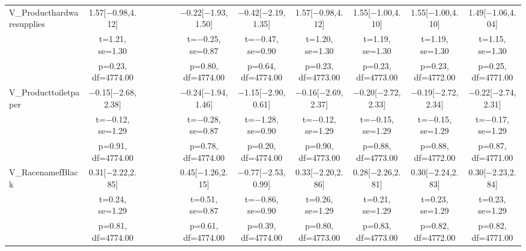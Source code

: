 \documentclass[]{report}
\begin{document}
\begin{table}
{\begin{tabular}[t]{lccccccccccc}
		V\_Producthardwaresupplies & \num{1.57}[\num{-0.98},\num{4.12}] &  &  &  &  & \num{-0.22}[\num{-1.93},\num{1.50}] & \num{-0.42}[\num{-2.19},\num{1.35}] & \num{1.57}[\num{-0.98},\num{4.12}] & \num{1.55}[\num{-1.00},\num{4.10}] & \num{1.55}[\num{-1.00},\num{4.10}] & \num{1.49}[\num{-1.06},\num{4.04}]\\
		& t=\num{1.21}, se=\num{1.30} &  &  &  &  & t=\num{-0.25}, se=\num{0.87} & t=\num{-0.47}, se=\num{0.90} & t=\num{1.20}, se=\num{1.30} & t=\num{1.19}, se=\num{1.30} & t=\num{1.19}, se=\num{1.30} & t=\num{1.15}, se=\num{1.30}\\
		& p=\num{0.23}, df=\num{4774.00} &  &  &  &  & p=\num{0.80}, df=\num{4774.00} & p=\num{0.64}, df=\num{4774.00} & p=\num{0.23}, df=\num{4773.00} & p=\num{0.23}, df=\num{4773.00} & p=\num{0.23}, df=\num{4772.00} & p=\num{0.25}, df=\num{4771.00}\\
		V\_Producttoiletpaper & \num{-0.15}[\num{-2.68},\num{2.38}] &  &  &  &  & \num{-0.24}[\num{-1.94},\num{1.46}] & \num{-1.15}[\num{-2.90},\num{0.61}] & \num{-0.16}[\num{-2.69},\num{2.37}] & \num{-0.20}[\num{-2.72},\num{2.33}] & \num{-0.19}[\num{-2.72},\num{2.34}] & \num{-0.22}[\num{-2.74},\num{2.31}]\\
		& t=\num{-0.12}, se=\num{1.29} &  &  &  &  & t=\num{-0.28}, se=\num{0.87} & t=\num{-1.28}, se=\num{0.90} & t=\num{-0.12}, se=\num{1.29} & t=\num{-0.15}, se=\num{1.29} & t=\num{-0.15}, se=\num{1.29} & t=\num{-0.17}, se=\num{1.29}\\
		& p=\num{0.91}, df=\num{4774.00} &  &  &  &  & p=\num{0.78}, df=\num{4774.00} & p=\num{0.20}, df=\num{4774.00} & p=\num{0.90}, df=\num{4773.00} & p=\num{0.88}, df=\num{4773.00} & p=\num{0.88}, df=\num{4772.00} & p=\num{0.87}, df=\num{4771.00}\\
		V\_RacenamefBlack & \num{0.31}[\num{-2.22},\num{2.85}] &  &  &  &  & \num{0.45}[\num{-1.26},\num{2.15}] & \num{-0.77}[\num{-2.53},\num{0.99}] & \num{0.33}[\num{-2.20},\num{2.86}] & \num{0.28}[\num{-2.26},\num{2.81}] & \num{0.30}[\num{-2.24},\num{2.83}] & \num{0.30}[\num{-2.23},\num{2.84}]\\
		& t=\num{0.24}, se=\num{1.29} &  &  &  &  & t=\num{0.51}, se=\num{0.87} & t=\num{-0.86}, se=\num{0.90} & t=\num{0.26}, se=\num{1.29} & t=\num{0.21}, se=\num{1.29} & t=\num{0.23}, se=\num{1.29} & t=\num{0.23}, se=\num{1.29}\\
		& p=\num{0.81}, df=\num{4774.00} &  &  &  &  & p=\num{0.61}, df=\num{4774.00} & p=\num{0.39}, df=\num{4774.00} & p=\num{0.80}, df=\num{4773.00} & p=\num{0.83}, df=\num{4773.00} & p=\num{0.82}, df=\num{4772.00} & p=\num{0.82}, df=\num{4771.00}\\

\end{tabular}}
\end{table}
\end{document}
